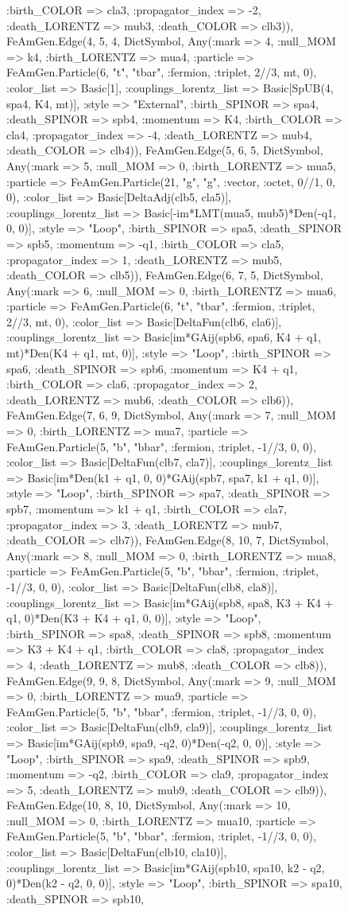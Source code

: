 \documentclass{revtex4}
\begin{document}
\begin{figure}[!htb]
\begin{center}
{:birth_COLOR => cla3, :propagator_index => -2, :death_LORENTZ => mub3, :death_COLOR => clb3)), FeAmGen.Edge(4, 5, 4, Dict{Symbol, Any}(:mark => 4, :null_MOM => k4, :birth_LORENTZ => mua4, :particle => FeAmGen.Particle(6, "t", "tbar", :fermion, :triplet, 2//3, mt, 0), :color_list => Basic[1], :couplings_lorentz_list => Basic[SpUB(4, spa4, K4, mt)], :style => "External", :birth_SPINOR => spa4, :death_SPINOR => spb4, :momentum => K4, :birth_COLOR => cla4, :propagator_index => -4, :death_LORENTZ => mub4, :death_COLOR => clb4)), FeAmGen.Edge(5, 6, 5, Dict{Symbol, Any}(:mark => 5, :null_MOM => 0, :birth_LORENTZ => mua5, :particle => FeAmGen.Particle(21, "g", "g", :vector, :octet, 0//1, 0, 0), :color_list => Basic[DeltaAdj(clb5, cla5)], :couplings_lorentz_list => Basic[-im*LMT(mua5, mub5)*Den(-q1, 0, 0)], :style => "Loop", :birth_SPINOR => spa5, :death_SPINOR => spb5, :momentum => -q1, :birth_COLOR => cla5, :propagator_index => 1, :death_LORENTZ => mub5, :death_COLOR => clb5)), FeAmGen.Edge(6, 7, 5, Dict{Symbol, Any}(:mark => 6, :null_MOM => 0, :birth_LORENTZ => mua6, :particle => FeAmGen.Particle(6, "t", "tbar", :fermion, :triplet, 2//3, mt, 0), :color_list => Basic[DeltaFun(clb6, cla6)], :couplings_lorentz_list => Basic[im*GAij(spb6, spa6, K4 + q1, mt)*Den(K4 + q1, mt, 0)], :style => "Loop", :birth_SPINOR => spa6, :death_SPINOR => spb6, :momentum => K4 + q1, :birth_COLOR => cla6, :propagator_index => 2, :death_LORENTZ => mub6, :death_COLOR => clb6)), FeAmGen.Edge(7, 6, 9, Dict{Symbol, Any}(:mark => 7, :null_MOM => 0, :birth_LORENTZ => mua7, :particle => FeAmGen.Particle(5, "b", "bbar", :fermion, :triplet, -1//3, 0, 0), :color_list => Basic[DeltaFun(clb7, cla7)], :couplings_lorentz_list => Basic[im*Den(k1 + q1, 0, 0)*GAij(spb7, spa7, k1 + q1, 0)], :style => "Loop", :birth_SPINOR => spa7, :death_SPINOR => spb7, :momentum => k1 + q1, :birth_COLOR => cla7, :propagator_index => 3, :death_LORENTZ => mub7, :death_COLOR => clb7)), FeAmGen.Edge(8, 10, 7, Dict{Symbol, Any}(:mark => 8, :null_MOM => 0, :birth_LORENTZ => mua8, :particle => FeAmGen.Particle(5, "b", "bbar", :fermion, :triplet, -1//3, 0, 0), :color_list => Basic[DeltaFun(clb8, cla8)], :couplings_lorentz_list => Basic[im*GAij(spb8, spa8, K3 + K4 + q1, 0)*Den(K3 + K4 + q1, 0, 0)], :style => "Loop", :birth_SPINOR => spa8, :death_SPINOR => spb8, :momentum => K3 + K4 + q1, :birth_COLOR => cla8, :propagator_index => 4, :death_LORENTZ => mub8, :death_COLOR => clb8)), FeAmGen.Edge(9, 9, 8, Dict{Symbol, Any}(:mark => 9, :null_MOM => 0, :birth_LORENTZ => mua9, :particle => FeAmGen.Particle(5, "b", "bbar", :fermion, :triplet, -1//3, 0, 0), :color_list => Basic[DeltaFun(clb9, cla9)], :couplings_lorentz_list => Basic[im*GAij(spb9, spa9, -q2, 0)*Den(-q2, 0, 0)], :style => "Loop", :birth_SPINOR => spa9, :death_SPINOR => spb9, :momentum => -q2, :birth_COLOR => cla9, :propagator_index => 5, :death_LORENTZ => mub9, :death_COLOR => clb9)), FeAmGen.Edge(10, 8, 10, Dict{Symbol, Any}(:mark => 10, :null_MOM => 0, :birth_LORENTZ => mua10, :particle => FeAmGen.Particle(5, "b", "bbar", :fermion, :triplet, -1//3, 0, 0), :color_list => Basic[DeltaFun(clb10, cla10)], :couplings_lorentz_list => Basic[im*GAij(spb10, spa10, k2 - q2, 0)*Den(k2 - q2, 0, 0)], :style => "Loop", :birth_SPINOR => spa10, :death_SPINOR => spb10, }
\end{center}
\end{figure}
\end{document}
